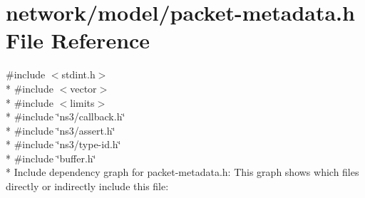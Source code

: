 \hypertarget{packet-metadata_8h}{}\section{network/model/packet-\/metadata.h File Reference}
\label{packet-metadata_8h}
{\ttfamily \#include $<$stdint.\+h$>$}\\*
{\ttfamily \#include $<$vector$>$}\\*
{\ttfamily \#include $<$limits$>$}\\*
{\ttfamily \#include \char`\"{}ns3/callback.\+h\char`\"{}}\\*
{\ttfamily \#include \char`\"{}ns3/assert.\+h\char`\"{}}\\*
{\ttfamily \#include \char`\"{}ns3/type-\/id.\+h\char`\"{}}\\*
{\ttfamily \#include \char`\"{}buffer.\+h\char`\"{}}\\*
Include dependency graph for packet-\/metadata.h\+:
This graph shows which files directly or indirectly include this file\+:

